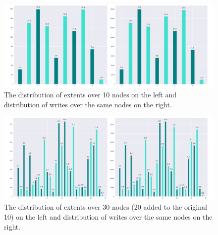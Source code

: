 \begin{figure}[ht!]
    \centering
    \includegraphics[scale=.075]{img/dist10nodes.png}
    \caption{The distribution of extents over 10 nodes on the left and distribution of writes over the same nodes on the right.}
    \label{fig:dist10}
\end{figure}
\begin{figure}[ht!]
    \centering
    \includegraphics[scale=.075]{img/dist30nodes.png}
    \caption{The distribution of extents over 30 nodes (20 added to the original 10) on the left and distribution of writes over the same nodes on the right.}
    \label{fig:dist30}
\end{figure}

\begin{table}[ht!]
    \centering
    \caption{Standard deviation of extents and writes over nodes.}
    \label{tab:stddev}
\end{table}

